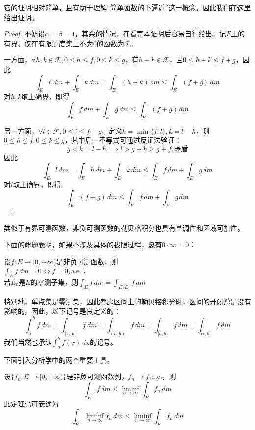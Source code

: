 它的证明相对简单，且有助于理解“简单函数的下逼近”这一概念，因此我们在这里给出证明。
\begin{proof}
    不妨设$\alpha=\beta=1$，其余的情况，在看完本证明后容易自行给出。记$E$上的有界、仅在有限测度集上不为0的函数为$\mathcal{F} $。

    一方面，$\forall h,k\in \mathcal{F},0\leq h\leq f,0\leq k\leq g$，有$h+k\in \mathcal{F}$，且$0\leq h+k\leq f+g$，因此
    \[\int_{E}h\,dm+\int_{E}k\,dm=\int_{E}(h+k)\,dm\leq \int_{E}(f+g)\,dm\]
    对$h,k$取上确界，即得
    \[\int_{E}f\,dm+\int_{E}g\,dm\leq \int_{E}(f+g)\,dm\]

    另一方面，$\forall l\in \mathcal{F},0\leq l\leq f+g$，定义$h=\min\{f,l\},k=l-h$，则$0\leq h\leq f,0\leq k\leq g$，其中后一不等式可通过反证法验证：
    \[g<k=l-h\implies l>g+h\geq g+f,\text{矛盾}\]
    因此
    \[\int_{E}l\,dm=\int_{E}h\,dm+\int_{E}k\,dm\leq \int_{E}f\,dm+\int_{E}g\,dm\]
    对$l$取上确界，即得
    \[\int_{E}(f+g)\,dm\leq \int_{E}f\,dm+\int_{E}g\,dm\]
\end{proof}
类似于有界可测函数，非负可测函数的勒贝格积分也具有单调性和区域可加性。

下面的命题表明，如果不涉及具体的极限过程，\textbf{总有$0\cdot\infty=0$}：

\begin{proposition}[$0\cdot\infty=0$]
    设$f:E\to[0,+\infty)$是非负可测函数，则\\
    $\int_{E}f\,dm=0\iff f=0,\text{a.e.}$；\\
    若$E_0$是$E$的零测子集，则$\int_{E}f\,dm=\int_{E\setminus E_0}f\,dm$

\end{proposition}

特别地，单点集是零测集，因此考虑区间上的勒贝格积分时，区间的开闭总是没有影响的，因此，以下记号是良定义的：
\[\int_{a}^{b}f\,dm=\int_{[a,b]}f\,dm=\int_{(a,b)}f\,dm=\int_{[a,b)}f\,dm=\int_{(a,b]}f\,dm\]
我们当然也承认$\int_{a}^{b}f(x)\,dx$的记号。

下面引入分析学中的两个重要工具。
\begin{theorem}[Fatou引理]
    设$\{f_n:E\to[0,+\infty)\}$是非负可测函数列，$f_n\to f,\text{a.e.}$，则
    \[\int_{E}f\,dm\leq \liminf_{n\to\infty}\int_{E}f_n\,dm\]
    此定理也可表述为
    \[\int_{E}\liminf_{n\to\infty}f_n\,dm\leq \liminf_{n\to\infty}\int_{E}f_n\,dm\]
\end{theorem}

